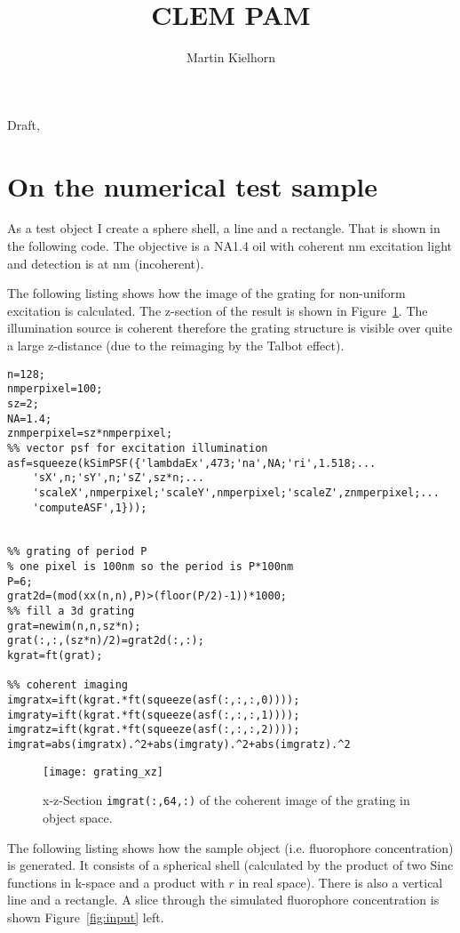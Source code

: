 \documentclass[11pt]{scrartcl}
\title{CLEM PAM}
\author{Martin Kielhorn} %
\newcommand{\figref}[1]{Figure~\ref{#1}}
\begin{document}
\maketitle

{\tiny Draft,}

\section{On the numerical test sample}


As a test object I create a sphere shell, a line and a rectangle.
That is shown in the following code.  The objective is a NA1.4 oil
with coherent \unit[473]{nm} excitation light and detection is at
\unit[520]{nm} (incoherent).

The following listing shows how the image of the grating for
non-uniform excitation is calculated. The z-section of the result is
shown in \figref{fig:grating}. The illumination source is coherent
therefore the grating structure is visible over quite a large
z-distance (due to the reimaging by the Talbot effect).


\begin{lstlisting}
n=128;
nmperpixel=100;
sz=2;
NA=1.4;
znmperpixel=sz*nmperpixel;
%% vector psf for excitation illumination
asf=squeeze(kSimPSF({'lambdaEx',473;'na',NA;'ri',1.518;...
    'sX',n;'sY',n;'sZ',sz*n;...
    'scaleX',nmperpixel;'scaleY',nmperpixel;'scaleZ',znmperpixel;...
    'computeASF',1}));


%% grating of period P
% one pixel is 100nm so the period is P*100nm
P=6;
grat2d=(mod(xx(n,n),P)>(floor(P/2)-1))*1000;
%% fill a 3d grating
grat=newim(n,n,sz*n);
grat(:,:,(sz*n)/2)=grat2d(:,:);
kgrat=ft(grat);

%% coherent imaging
imgratx=ift(kgrat.*ft(squeeze(asf(:,:,:,0))));
imgraty=ift(kgrat.*ft(squeeze(asf(:,:,:,1))));
imgratz=ift(kgrat.*ft(squeeze(asf(:,:,:,2))));
imgrat=abs(imgratx).^2+abs(imgraty).^2+abs(imgratz).^2
\end{lstlisting}

\begin{figure}[htb]
  \centering
  \texttt{[image: grating\_xz]}

  \caption{x-z-Section {\tt imgrat(:,64,:)} of the coherent
    image of the grating in object space.}
  \label{fig:grating}
\end{figure}

The following listing shows how the sample object (i.e. fluorophore
concentration) is generated.  It consists of a spherical shell
(calculated by the product of two Sinc functions in k-space and a
product with $r$ in real space). There is also a vertical line and a
rectangle. A slice through the simulated fluorophore concentration is
shown \figref{fig:input} left.
\end{document}
